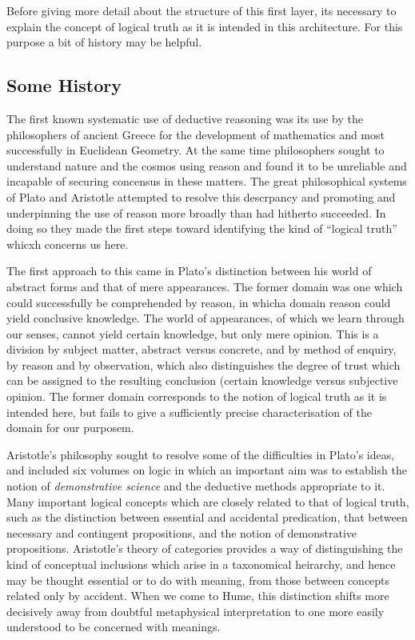 \documentclass[10pt,titlepage]{article}
\begin{document}
Before giving more detail about the structure of this first layer, its necessary to explain the concept of logical truth as it is intended in this architecture.
For this purpose a bit of history may be helpful.

\subsection{Some History}

The first known systematic use of deductive reasoning was its use by the philosophers of ancient Greece for the development of mathematics and most successfully in Euclidean Geometry.
At the same time philosophers sought to understand nature and the cosmos using reason and found it to be unreliable and incapable of securing concensus in these matters.
The great philosophical systems of Plato and Aristotle attempted to resolve this descrpancy and promoting and underpinning  the use of reason more broadly than had hitherto succeeded.
In doing so they made the first steps toward identifying the kind of ``logical truth'' whicxh concerns us here.

The first approach to this came in Plato's distinction between his world of abstract forms and that of mere appearances.
The former domain was one which could successfully be comprehended by reason, in whicha domain reason could yield conclusive knowledge.
The world of appearances, of which we learn through our senses, cannot yield certain knowledge, but only mere opinion.
This is a division by subject matter, abstract versus concrete, and by method of enquiry, by reason and by observation, which also distinguishes the degree of trust which can be assigned to the resulting conclusion (certain knowledge versus subjective opinion.
The former domain corresponds to the notion of logical truth as it is intended here, but fails to give a sufficiently precise characterisation of the domain for our purposem.

Aristotle's philosophy sought to resolve some of the difficulties in Plato's ideas, and included six volumes on logic in which an important aim was to establish the notion of \emph{demonstrative science} and the deductive methods appropriate to it.
Many important logical concepts which are closely related to that of logical truth, such as the distinction between essential and accidental predication, that between necessary and contingent propositions, and the notion of demonstrative propositions.
Aristotle's theory of categories provides a way of distinguishing the kind of conceptual inclusions which arise in a taxonomical heirarchy, and hence may be thought essential or to do with meaning, from those between concepts related only by accident.
When we come to Hume, this distinction shifts more decisively away from doubtful metaphysical interpretation to one more easily understood to be concerned with meanings.
\end{document}
